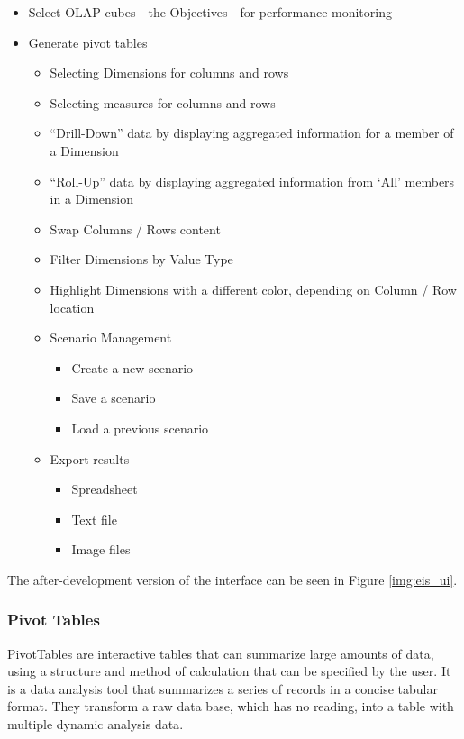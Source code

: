 \begin{itemize}
  \item Select OLAP cubes - the Objectives - for performance monitoring
  \item Generate pivot tables
  \begin{itemize}
    \item Selecting Dimensions for columns and rows
    \item Selecting measures for columns and rows
    \item “Drill-Down” data by displaying aggregated information for a member of
    a Dimension
	\item “Roll-Up” data by displaying aggregated information from ‘All’ members
	in a Dimension
	\item Swap Columns / Rows content
	\item Filter Dimensions by Value Type
	\item Highlight Dimensions with a different color, depending on Column / Row
	location
	\item Scenario Management
	\begin{itemize}
	  \item Create a new scenario
	  \item Save a scenario
	  \item Load a previous scenario
	 \end{itemize}
	 \item Export results
	 \begin{itemize}
	   \item Spreadsheet
	   \item Text file
	   \item Image files
	  \end{itemize}
  \end{itemize}
\end{itemize}

The after-development version of the interface can be seen in Figure
\ref{img:eis_ui}.


\subsubsection{Pivot Tables}

PivotTables are interactive tables that can summarize large amounts of data,
using a structure and method of calculation that can be specified by the user.
It is a data analysis tool that summarizes a series of records in a concise
tabular format. They transform a raw data base, which has no reading, into a
table with multiple dynamic analysis data\cite{blog:proiete}.

